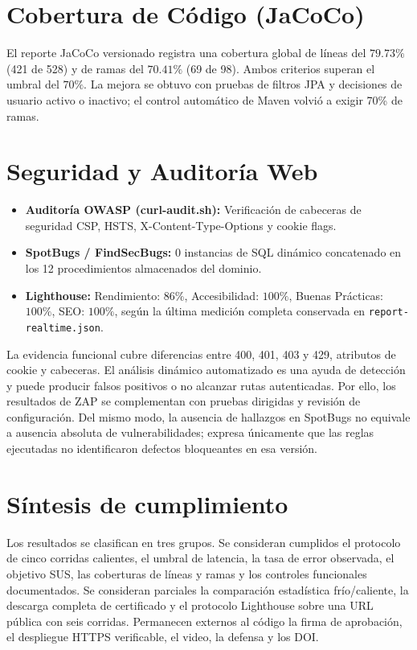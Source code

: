 \documentclass[11pt,a4paper]{report}
\begin{document}
\section{Cobertura de Código (JaCoCo)}
El reporte JaCoCo versionado registra una cobertura global de líneas del $79.73\%$ (421 de 528) y de ramas del $70.41\%$ (69 de 98). Ambos criterios superan el umbral del $70\%$. La mejora se obtuvo con pruebas de filtros JPA y decisiones de usuario activo o inactivo; el control automático de Maven volvió a exigir 70\% de ramas.

\section{Seguridad y Auditoría Web}
\begin{itemize}
    \item \textbf{Auditoría OWASP (curl-audit.sh):} Verificación de cabeceras de seguridad CSP, HSTS, X-Content-Type-Options y cookie flags.
    \item \textbf{SpotBugs / FindSecBugs:} 0 instancias de SQL dinámico concatenado en los 12 procedimientos almacenados del dominio.
    \item \textbf{Lighthouse:} Rendimiento: $86\%$, Accesibilidad: $100\%$, Buenas Prácticas: $100\%$, SEO: $100\%$, según la última medición completa conservada en \texttt{report-realtime.json}.
\end{itemize}

La evidencia funcional cubre diferencias entre 400, 401, 403 y 429, atributos de cookie y cabeceras. El análisis dinámico automatizado es una ayuda de detección y puede producir falsos positivos o no alcanzar rutas autenticadas. Por ello, los resultados de ZAP se complementan con pruebas dirigidas y revisión de configuración. Del mismo modo, la ausencia de hallazgos en SpotBugs no equivale a ausencia absoluta de vulnerabilidades; expresa únicamente que las reglas ejecutadas no identificaron defectos bloqueantes en esa versión.

\section{Síntesis de cumplimiento}
Los resultados se clasifican en tres grupos. Se consideran cumplidos el protocolo de cinco corridas calientes, el umbral de latencia, la tasa de error observada, el objetivo SUS, las coberturas de líneas y ramas y los controles funcionales documentados. Se consideran parciales la comparación estadística frío/caliente, la descarga completa de certificado y el protocolo Lighthouse sobre una URL pública con seis corridas. Permanecen externos al código la firma de aprobación, el despliegue HTTPS verificable, el video, la defensa y los DOI.
\end{document}
